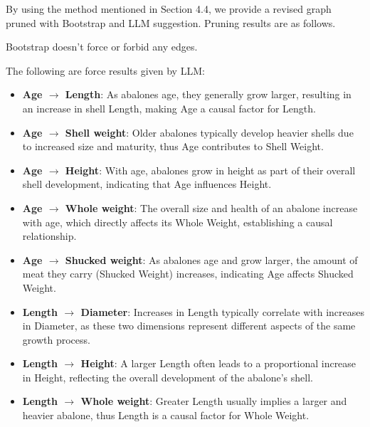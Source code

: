 \documentclass{article}
\begin{document}
\begin{minipage}[t]{0.6\linewidth}
By using the method mentioned in Section 4.4, we provide a revised graph pruned with Bootstrap and LLM suggestion.
Pruning results are as follows.
        
            Bootstrap doesn't force or forbid any edges.
            
            The following are force results given by LLM:
            
            \begin{itemize}
                \item \textbf{Age $\rightarrow$ Length}: As abalones age, they generally grow larger, resulting in an increase in shell Length, making Age a causal factor for Length.
                
                \item \textbf{Age $\rightarrow$ Shell weight}: Older abalones typically develop heavier shells due to increased size and maturity, thus Age contributes to Shell Weight.
                
                \item \textbf{Age $\rightarrow$ Height}: With age, abalones grow in height as part of their overall shell development, indicating that Age influences Height.
                
                \item \textbf{Age $\rightarrow$ Whole weight}: The overall size and health of an abalone increase with age, which directly affects its Whole Weight, establishing a causal relationship.
                
                \item \textbf{Age $\rightarrow$ Shucked weight}: As abalones age and grow larger, the amount of meat they carry (Shucked Weight) increases, indicating Age affects Shucked Weight.
                
                \item \textbf{Length $\rightarrow$ Diameter}: Increases in Length typically correlate with increases in Diameter, as these two dimensions represent different aspects of the same growth process.
                
                \item \textbf{Length $\rightarrow$ Height}: A larger Length often leads to a proportional increase in Height, reflecting the overall development of the abalone's shell.
                
                \item \textbf{Length $\rightarrow$ Whole weight}: Greater Length usually implies a larger and heavier abalone, thus Length is a causal factor for Whole Weight.
                

\end{itemize}
\end{minipage}
\end{document}
